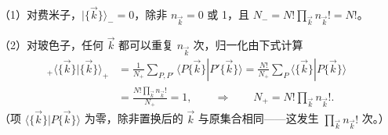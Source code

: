 
（1）对费米子，$|\{\vec k\}\rangle_-=0$，除非 $n_{\vec k}=0$ 或 1，且 $N_-=N!\prod_{\vec k}n_{\vec k}!=N!$。

（2）对玻色子，任何 $\vec k$ 都可以重复 $n_{\vec k}$ 次，归一化由下式计算
\begin{equation}\label{eq:7.9}
\begin{aligned}
{}_+\langle\{\vec k\}|\{\vec k\}\rangle_+&=\frac1{N_+}\sum_{P,P'}\langle P\{\vec k\}|P'\{\vec k\}\rangle=\frac{N!}{N_+}\sum_P\langle\{\vec k\}|P\{\vec k\}\rangle\\
&=\frac{N!\prod_{\vec k}n_{\vec k}!}{N_+}=1,\qquad\Longrightarrow\qquad N_+=N!\prod_{\vec k}n_{\vec k}!.
\end{aligned}
\end{equation}
（项 $\langle\{\vec k\}|P\{\vec k\}\rangle$ 为零，除非置换后的 $\vec k$ 与原集合相同——这发生 $\prod_{\vec k}n_{\vec k}!$ 次。）


